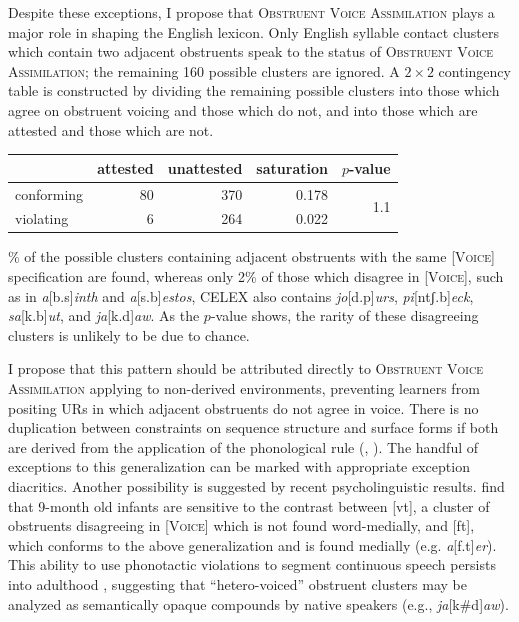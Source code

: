 Despite these exceptions, I propose that \textsc{Obstruent Voice Assimilation} plays a major role in shaping the English lexicon. Only English syllable contact clusters which contain two adjacent obstruents speak to the status of \textsc{Obstruent Voice Assimilation}; the remaining 160 possible clusters are ignored. A $2 \times 2$ contingency table is constructed by dividing the remaining possible clusters into those which agree on obstruent voicing and those which do not, and into those which are attested and those which are not.

\begin{example}
\vspace{0.5\baselineskip}
\begin{tabular}{l r r r r}
\toprule
           & attested & unattested & saturation & $p$-value \\
\midrule
conforming & 80 & 370 & 0.178 & \multirow{2}{*}{1.1\e{-11}}\\
violating  &  6 & 264 & 0.022 \\
\bottomrule
\end{tabular}
\end{example}

\% of the possible clusters containing adjacent obstruents with the same [\textsc{Voice}] specification are found, whereas only 2\%  of those which disagree in [\textsc{Voice}], such as in \emph{a}[b.s]\emph{inth} and \emph{a}[s.b]\emph{estos}, CELEX also contains \emph{jo}[d.p]\emph{urs}, \emph{pi}[ntʃ.b]\emph{eck}, \emph{sa}[k.b]\emph{ut}, and \emph{ja}[k.d]\emph{aw}. As the $p$-value shows, the rarity of these disagreeing clusters is unlikely to be due to chance. 

I propose that this pattern should be attributed directly to \textsc{Obstruent Voice Assimilation} applying to non-derived environments, preventing learners from positing URs in which adjacent obstruents do not agree in voice. There is no duplication between constraints on sequence structure and surface forms if both are derived from the application of the phonological rule (\citealt[][401f.]{Stanley1967}, \citealt[][382]{SPE}). The handful of exceptions to this generalization can be marked with appropriate exception diacritics. Another possibility is suggested by recent psycholinguistic results. \citet{Mattys2001b} find that 9-month old infants are sensitive to the contrast between [vt], a cluster of obstruents disagreeing in [\textsc{Voice}] which is not found word-medially, and [ft], which conforms to the above generalization and is found medially (e.g. \emph{a}[f.t]\emph{er}). This ability to use phonotactic violations to segment continuous speech persists into adulthood \citep{McQueen1998}, suggesting that ``hetero-voiced'' obstruent clusters may be analyzed as semantically opaque compounds by native speakers (e.g., \emph{ja}[k\#d]\emph{aw}). 

